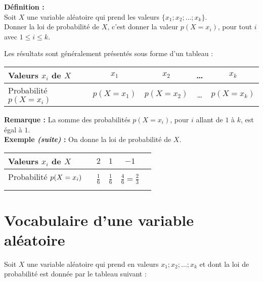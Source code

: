 \documentclass{article}
\begin{document}
\begin{mdframed}[style=definitionStyle]
    \textbf{Définition :} ~\\
    Soit $X$ une variable aléatoire qui prend les valeurs $\{x_1;x_2;\dots;x_k\}$. \\
    Donner la loi de probabilité de $X$, c'est donner la valeur $p(X=x_i)$, pour tout $i$ avec $1\leq i\leq k$.
    \vspace*{4pt}

    Les résultats sont généralement présentés sous forme d'un tableau : \\
    \vspace*{-8pt}

    \renewcommand{\arraystretch}{1.6}
    \begin{tabular}{|l|c|c|c|c|}
        \hline
        Valeurs $x_i$ de $X$ & $x_1$      & $x_2$      & \quad\text{ }\dots\quad\text{ } & $x_k$      \\
        \hline
        Probabilité $p(X=x_i)$     & $p(X=x_1)$ & $p(X=x_2)$ & \quad\text{ }\dots\quad\text{ } & $p(X=x_k)$ \\
        \hline
    \end{tabular}
\end{mdframed}

\textbf{Remarque :} La somme des probabilités $p(X=x_i)$, pour $i$ allant de $1$ à $k$, est égal à $1$.\\

\textbf{Exemple \emph{(suite)} :} On donne la loi de probabilité de $X$.\\
\renewcommand{\arraystretch}{2}
\begin{tabular}{|l|c|c|c|c|}
    \hline
    Valeurs $x_i$ de $X$      & $2$                        & $1$                        & $-1$                                   \\
    \hline
    Probabilité  $p(X=x_i)\displaystyle{\color{white}\frac{1}{\frac{1}{1}}}$ & $\displaystyle\frac{1}{6}$ & $\displaystyle\frac{1}{6}$ & $\displaystyle\frac{4}{6}=\frac{2}{3}$ \\
    \hline
\end{tabular}

\section{Vocabulaire d'une variable aléatoire}

Soit $X$ une variable aléatoire qui prend en valeurs ${x_1;x_2;\dots;x_k}$ et dont la loi de probabilité est donnée par le tableau suivant :
\vspace{-12pt}
\end{document}
